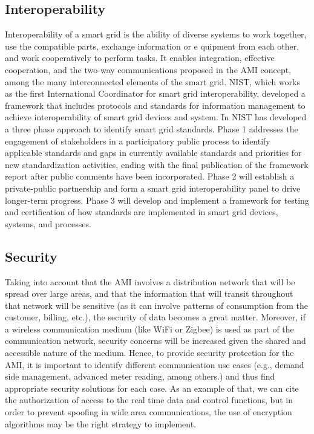 \documentclass[11pt,draftclsnofoot,onecolumn]{IEEEtran}
\begin{document}
\subsection{Interoperability}
Interoperability of a smart grid is the ability of diverse systems to work together, use the compatible parts, exchange information or e quipment from each other, and work cooperatively to perform tasks. It enables integration, effective cooperation, and the two-way communications proposed in the AMI concept, among the many interconnected elements of the smart grid. NIST, which works as the first International Coordinator for smart grid interoperability, developed a framework that includes protocols and standards for information management to achieve interoperability of smart grid devices and system. In \cite{NIST2010} NIST has developed a three phase approach to identify smart grid standards. Phase 1 addresses the engagement of stakeholders in a participatory public process to identify applicable standards and gaps in currently available standards and priorities for new standardization activities, ending with the final publication of the framework report after public comments have been incorporated. Phase 2 will establish a private-public partnership and form a smart grid interoperability panel to drive longer-term progress. Phase 3 will develop and implement a framework for testing and certification of how standards are implemented in smart grid devices, systems, and processes.

\subsection{Security}
Taking into account that the AMI involves a distribution network that will be spread over large areas, and that the information that will transit throughout that network will be sensitive (as it can involve patterns of consumption from the customer, billing, etc.), the security of data becomes a great matter. Moreover, if a wireless communication medium (like WiFi or Zigbee) is used as part of the communication network, security concerns will be increased given the shared and accessible nature of the medium. Hence, to provide security protection for the AMI, it is important to identify different communication use cases (e.g., demand side management, advanced meter reading, among others.) and thus find appropriate security solutions for each case. As an example of that, we can cite the authorization of access to the real time data and control functions, but in order to prevent spoofing in wide area communications, the use of encryption algorithms may be the right strategy to implement. 
\end{document}
